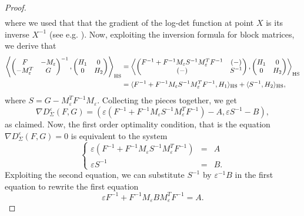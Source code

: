 \documentclass[]{article}
\DeclareMathOperator{\HS}{HS}
\numberwithin{equation}{section}
\theoremstyle{plain}
\begin{document}
{\begin{proof}
\begin{align*}
	\end{align*}
	where we used that that the gradient of the log-det function at point $X$ is its inverse $X^{-1}$ (see e.g. \cite[p.~641]{boyd2004convex}). Now, exploiting the inversion formula for block matrices, we derive that
	\begin{align*}
		\left \langle \begin{pmatrix}
			F & -M_{\varepsilon}\\
			- M_{\varepsilon}^T& G
		\end{pmatrix}^{-1} , \begin{pmatrix}
			H_1 & 0\\
			0 & H_2
		\end{pmatrix} \right \rangle_{\rm HS}& = \left \langle \begin{pmatrix}
			F^{-1}+F^{-1}M_\varepsilon S^{-1}M_\varepsilon^T F^{-1} & (-) \\
			(-) & S^{-1}
		\end{pmatrix} , \begin{pmatrix}
			H_1 & 0\\
			0 & H_2
		\end{pmatrix} \right \rangle_{\rm HS}\\ 
		&= \langle F^{-1} + F^{-1} M_{\varepsilon}S^{-1} M_{\varepsilon}^TF^{-1}, H_1 \rangle_{\HS} + \langle  S^{-1}, H_2 \rangle_{\HS},
	\end{align*}
	where $S = G- M_\varepsilon^TF^{-1}M_\varepsilon$. Collecting the pieces together, we get 
	\begin{equation*}
		\nabla D_{\Sigma}^\varepsilon(F,G) = (\varepsilon (F^{-1}+ F^{-1} M_{\varepsilon}S^{-1} M_{\varepsilon}^TF^{-1}) -A,   \varepsilon S^{-1}-B),
	\end{equation*}
	as claimed. Now, the first order optimality condition, that is the equation $\nabla D_\Sigma^\varepsilon(F,G) = 0$ is equivalent to the system
	\begin{equation}\label{eq:first_dual}
		\left\{ 
		\begin{array}{ccc}
			\varepsilon(F^{-1}+F^{-1} M_{\varepsilon}S^{-1} M_{\varepsilon}^TF^{-1}  ) & = & A \\
			\varepsilon S^{-1} & = & B.
		\end{array}
		\right.
	\end{equation}
	Exploiting the second equation, we can substitute $S^{-1}$ by $\varepsilon^{-1}B$ in the first equation to rewrite the first equation 
	\begin{equation}
		\varepsilon F^{-1}+ F^{-1} M_{\varepsilon}B M_{\varepsilon}^TF^{-1}    =  A.

\end{equation}
\end{proof}}
\end{document}
